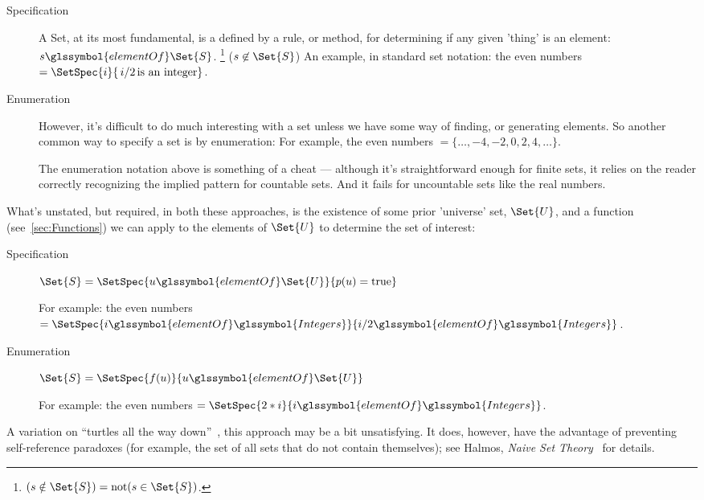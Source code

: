 \begin{description}

\item[Specification]

A \gls{Set}, at its most fundamental, is a defined by a rule,
or method,
for determining if any given 'thing' is an element: 
$s \glssymbol{elementOf} \Set{S}$.
\footnote{$(s \notin \Set{S}) = \text{not}(s \in \Set{S})$.}
($s \not\in \Set{S}$)
An example, in standard set notation:
the even numbers 
$= \SetSpec{ i }{ \, i/2 \, \text{is an integer} }$.

\item[Enumeration]

However, it's difficult to do much interesting with a set
unless we have some way of finding, or generating elements.
So another common way to specify a set is by enumeration:
For example, the even numbers $= \{ \ldots, -4, -2, 0, 2 ,4,
\ldots \}$.

The enumeration notation above is something of a cheat ---
although it's straightforward enough for finite sets, it relies on
the reader correctly recognizing the implied pattern for countable
sets.
And it fails for uncountable sets like the real numbers.

\end{description}

What's unstated, but required, in both these approaches, is the
existence of some prior 'universe' set, $\Set{U}$, and a function
(see~\autoref{sec:Functions}) we can apply to the elements of
$\Set{U}$ to determine the set of interest:

\begin{description}
\item[Specification] 
$\Set{S} =
\SetSpec{ u \glssymbol{elementOf} \Set{U} }{ p(u) = \text{true} }$ 

For example: the even numbers
 $= \SetSpec{ i \glssymbol{elementOf} 
\glssymbol{Integers} }{
 i/2 \glssymbol{elementOf} \glssymbol{Integers} }$.

\item[Enumeration]
$\Set{S} =
\SetSpec{ f(u) }{ u \glssymbol{elementOf} \Set{U} }$ 

For example: the even numbers 
$= \SetSpec{ 2*i }{ i \glssymbol{elementOf} \glssymbol{Integers} }$.

\end{description}
A variation on 
``turtles all the way down''~\cite{xkcd:Turtles, wiki:Turtles},
this approach may be a bit unsatisfying.
It does, however, have the advantage of preventing self-reference
paradoxes (for example, 
the set of all sets that do not contain themselves); 
see Halmos, 
\textit{Naive Set Theory}~\cite[section 2]{Halmos1960Naive} 
for details.

